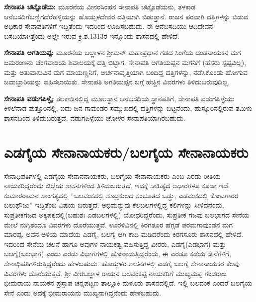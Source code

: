 \vskip 2pt

\textbf{ಸೇನಾಪತಿ ಚಟ್ಟೊಡೆಯ:} ಮೂರನೆಯ ವೀನರಸಿಂಹನ ಸೇನಾಪತಿ ಚಟ್ಟೊಡೆಯನು, ತಳಕಾಡ ಆನೆಬಸದಿಗೆ\break ಬಣ್ಣಿಗದೆರೆಹಳ್ಳಿಯನ್ನು ಹೊಯ್ಸಳದೇವರ ದತ್ತಿಯಾಗಿ ಬಿಡುತ್ತಾನೆ. ರಾಜನ ಪರವಾಗಿ ದತ್ತಿಗಳನ್ನು ಬಿಡುವ ಅಧಿಕಾರ ಸೇನಾಪತಿಗಳಿಗೆ ಇದ್ದಿತೆಂದು ಇದರಿಂದ ಊಹಿಸಬಹುದು. ಈ ಆನೆಬಸದಿಯು ಆದಿದೇವನ ಬಸದಿಯಾಗಿತ್ತೆಂದು ಅಲ್ಲೇ ಇರುವ ಕ್ರಿ.ಶ.1313ರ ಇನ್ನೊಂದು ಶಾಸನದಲ್ಲಿ ಹೇಳಿದೆ.

\vskip 2pt

\textbf{ಸೇನಾಪತಿ ಅಗತಿಯಪ್ಪ:} ಮೂರನೆಯ ಬಲ್ಲಾಳನ ಶ‍್ರೀಮನ್​ ಮಹಾಪ್ರಧಾನ ಗಡದ ಸಿಂಗೆಯ ದಂಡನಾಯಕನ ಮಗ ಜಮರಂಣನು ಚೆಂಗವಾಡಿಯ ಶಿವಾಲಯಕ್ಕೆ ದತ್ತಿ ಬಿಟ್ಟಾಗ. ಸೇನಾಪತಿ ಅಗತಿಯಪ್ಪನ ಮಗನಿಗೆ (ಹೆಸರು ಸ್ಪಷ್ಟವಿಲ್ಲ), ಮತ್ತು ಅತುವಾಸುವಿನ ಮಗ ಮಾಯಣ್ಣನಿಗೆ, ಅರ್ಚನಾವೃತ್ತಿಯಾಗಿ ಬಂದಿದ್ದ ದತ್ತಿಗಳನ್ನು, ನಡೆಸಿಕೊಂಡು ಹೋಗುವ ಜವಾಬ್ದಾರಿಯನ್ನು ವಹಿಸಲಾಯಿತು. ಸೇನಾಪತಿ ಅಗತಿಯಪ್ಪನ ಬಗ್ಗೆ ಹೆಚ್ಚಿನ ವಿವರಗಳು ತಿಳಿದುಬರುವುದಿಲ್ಲ.

\vskip 2pt

\textbf{ಸೇನಾಪತಿ ವಡುಗಪಿಳ್ಳೈ:} ತಲಕಾಡಿನಲ್ಲಿದ್ದ ಮೂಲಸ್ಥಾನ ಆನೆಬಸದಿಯ ಸ್ಥಾನಪತಿಗೆ, ಸೇನಾಪತಿ ವಡುಗಪಿಳ್ಳೆಯು ಕಿಳಲೆನಾಡ ಪುತ್ತೂರಿನಲ್ಲಿ, ಐದು ಜನ ಗಾವುಂಡರ ಸಮ್ಮುಖದಲ್ಲಿ ದತ್ತಿಗಳನ್ನು ಬಿಟ್ಟನೆಂದು, ಹುಸ್ಕೂರಿನಲ್ಲಿರುವ ತಮಿಳು ಶಾಸನದಿಂದ ತಿಳಿದುಬರುತ್ತದೆ. ವಡುಗಪಿಳ್ಳೆಯು ಚೋಳರ ಸೇನಾಪತಿಯಾಗಿರಬಹುದು.


\section*{ಎಡಗೈಯ ಸೇನಾನಾಯಕರು/ಬಲಗೈಯ ಸೇನಾನಾಯಕರು}

ಸೇನಾಧಿಪತಿಗಳಲ್ಲಿ ಎಡಗೈಯ ಸೇನಾನನಾಯಕರು, ಬಲಗೈಯ ಸೇನಾನಾಯಕರು ಎಂಬ ಎರಡು ರೀತಿಯ ನಾಯಕರಿದ್ದ\-ರೆಂದು ಜಿಲ್ಲೆಯ ಶಾಸನಗಳಿಂದ ತಿಳಿದುಬರುತ್ತದೆ. ಇದಕ್ಕೆ ಸಾಹಿತ್ಯದ ಆಧಾರಗಳೂ ಕೂಡಾ ಇದೆ. ಕುಮಾರರಾಮನ ಸಾಂಗತ್ಯದಲ್ಲಿ “ಬಲವಂಕದಲ್ಲಿ ಶೂದ್ರಕುಲದ ಸಂಭೂತದ ಒಡ್ಡು, ಎಡವಂಕದಲ್ಲಿ ಕೋಟಗಾರರ ಬಲುಫೌಜು” ಇದ್ದಿತೆಂಬ ವಿಷಯ ಬರುತ್ತದೆ. ಅಭಿಮನ್ಯುವು ಕೆಲಬಲಗಳಲ್ಲಿದ್ದ ಕಲಿಗಳನ್ನು ಸೀಳಿದನೆಂದು, ಸುಪ್ರತೀಕಗಜದ ಅಕ್ಕಪಕ್ಕದಲ್ಲಿ\break (ಬಹುಶಃ ಎಡಬಲಗಳಲ್ಲಿ) ಯೋಧರಿದ್ದರೆಂದು, ಸುಪ್ರತೀಕ ಗಜವು ಬಲಭಾಗದ ಸೇನೆಯ ಮೇಲೆ ನುಗ್ಗಿತೆಂದೂ ವಿವರಗಳು ದೊರೆಯುತ್ತವೆ. ಊರಳಿವಿನಲ್ಲಿ ಕಿರಗತೂರ ಹೆಗ್ಗಡೆ ಪರಮಗಾವುಂಡನ ಮಗ ಮಾರಪ್ಪ, ಅವನ ಅಳಿಯ ಮಾದೆಯ ಎಡಗೈ, ಬಲಗೈ ಆಗಿ ಕಾದಿ ಮಡಿದರೆಂದು ಕಿರಗಸೂರು ಶಾಸನದಲ್ಲಿ ಹೇಳಿದೆ. ಇದರಿಂದ ಸೇನೆಯ ಚಲನೆ ಹಾಗೂ ಅವುಗಳ ನಾಯಕತ್ವ ವಹಿಸುತ್ತಿದ್ದ ವೀರರು, ಎಡಗೈ(ಎಡಭಾಗ) ಮತ್ತು ಬಲಗೈ(ಬಲಭಾಗ) ಎಂದು ಎರಡು ವಿಭಾಗಗಳಲ್ಲಿ ಹೋರಾಡುತ್ತಿದ್ದರೆಂದು, ಈ ಎರಡೂ ಕಡೆಯ ಸೇನೆಗಳಿಗೆ, ಸೇನಾಧಿಪತಿಗಳಿರುತ್ತಿದ್ದರೆಂದು ಹೇಳಬಹುದು. ಹೊಯ್ಸಳರ ಶಾಸನಗಳಲ್ಲಿ ಎಡಗೈ ಬಲಗೈ ಸೇನಾನಾಯಕರ ಕೆಲವು ವಿವರಗಳು ದೊರೆಯುತ್ತವೆ. ಶ‍್ರೀ ವೀರಬಲ್ಲಾಳ ರಾಯನ ಬಲವಂಕಪ್ಪ ನಾಯಕರಿಗೆ ಮುಖ್ಯಮಪ್ಪ ಗಂಡರಾಜ ಭೀಮರಾಯ ನಾಯಕನ ಪ್ರಸ್ತಾಪ ಚನ್ನಪಟ್ಟಣ ತಾಲ್ಲೂಕಿ ಮಳೂರು ಶಾಸನದಲ್ಲಿದೆ. ಇಲ್ಲಿ ಬಲವಂಕ ಎಂದರೆ ಬಲಗೈಯ ಸೇನೆ ಎಂದು ಅದಕ್ಕೆ ಭೀಮರಾಯನು ಮುಖ್ಯನಾಗಿದ್ದನೆಂದು ಹೇಳಬಹುದು.

